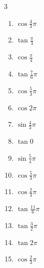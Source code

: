 \begin{multicols}{3}
\begin{enumerate}
  \item $\displaystyle \cos{\frac{4}{3}\pi}$

  \item $\displaystyle \tan{\frac{\pi}{3}}$

  \item $\displaystyle \cos{\frac{\pi}{4}}$

  \item $\displaystyle \tan{\frac{7}{6}\pi}$

  \item $\displaystyle \cos{\frac{5}{3}\pi}$

\columnbreak %

  \item $\displaystyle \cos{2\pi}$
        \phantom{$\displaystyle =1$}

  \item $\displaystyle \sin{\frac{4}{3}\pi}$

  \item $\displaystyle \tan{0}$
        \phantom{$\displaystyle =0$}

  \item $\displaystyle \sin{\frac{5}{4}\pi}$

  \item $\displaystyle \cos{\frac{5}{3}\pi}$

  \item $\displaystyle \cos{\frac{2}{3}\pi}$

  \item $\displaystyle \tan{\frac{11}{6}\pi}$

  \item $\displaystyle \tan{\frac{3}{2}\pi}$
        \phantom{$\displaystyle \quad なし$}

  \item $\displaystyle \tan{2\pi}$
        \phantom{$\displaystyle =0$}

  \item $\displaystyle \cos{\frac{2}{3}\pi}$


\end{enumerate}
\end{multicols}
